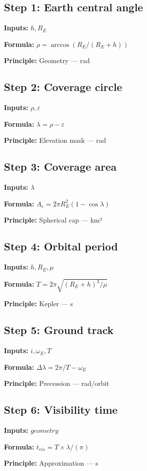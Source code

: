 \documentclass[11pt,twocolumn]{article}
\begin{document}
\subsection*{Step 1: Earth central angle}
\textbf{Inputs:} $h, R_E$

\textbf{Formula:} $\rho = \arccos(R_E/(R_E+h))$

\textbf{Principle:} Geometry --- rad

\subsection*{Step 2: Coverage circle}
\textbf{Inputs:} $\rho, \varepsilon$

\textbf{Formula:} $\lambda = \rho - \varepsilon$

\textbf{Principle:} Elevation mask --- rad

\subsection*{Step 3: Coverage area}
\textbf{Inputs:} $\lambda$

\textbf{Formula:} $A_c = 2\pi R_E^2 (1-\cos\lambda)$

\textbf{Principle:} Spherical cap --- km²

\subsection*{Step 4: Orbital period}
\textbf{Inputs:} $h, R_E, \mu$

\textbf{Formula:} $T = 2\pi\sqrt{(R_E+h)^3/\mu}$

\textbf{Principle:} Kepler --- s

\subsection*{Step 5: Ground track}
\textbf{Inputs:} $i, \omega_E, T$

\textbf{Formula:} $\Delta\lambda = 2\pi/T - \omega_E$

\textbf{Principle:} Precession --- rad/orbit

\subsection*{Step 6: Visibility time}
\textbf{Inputs:} $geometry$

\textbf{Formula:} $t_{vis} = T \times \lambda/(\pi)$

\textbf{Principle:} Approximation --- s
\end{document}

